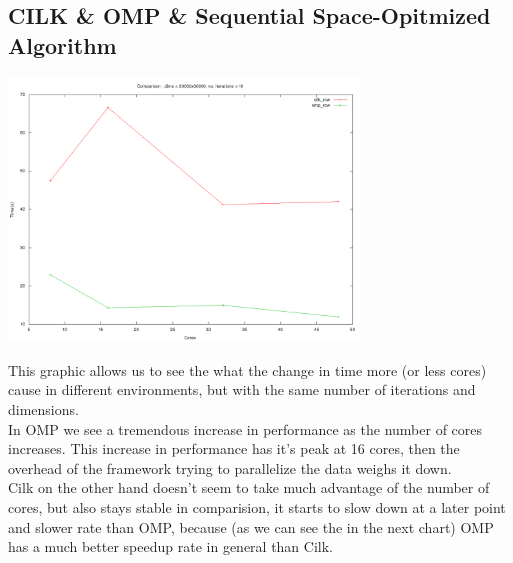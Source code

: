 \documentclass[11pt]{article}
\begin{document}
\subsection {CILK \& OMP \& Sequential Space-Opitmized Algorithm }
\begin{center}
\includegraphics[width=0.7\textwidth]{compcxtompcilk.png}
\end{center}
This graphic allows us to see the what the change in time more (or less cores) cause in different environments, but with the same number of iterations and dimensions.\\
In OMP we see a tremendous increase in performance as the number of cores increases. This increase in performance has it's peak at 16 cores, then the overhead of the framework trying to parallelize the data weighs it down. \\
Cilk on the other hand doesn't seem to take much advantage of the number of cores, but also stays stable in comparision, it starts to slow down at a later point and slower rate than OMP, because (as we can see the in the next chart) OMP has a much better speedup rate in general than Cilk.
\end{document}
